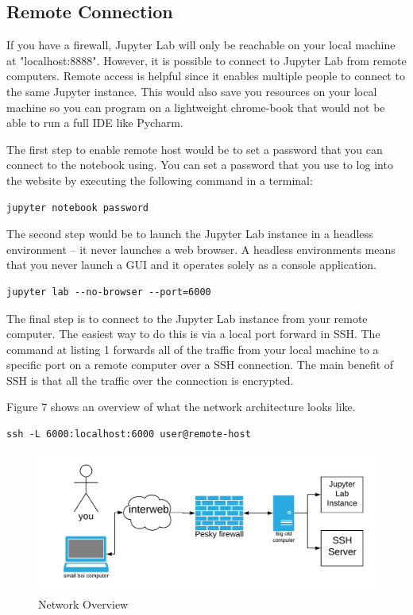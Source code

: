 \documentclass[pdftex,12pt]{artikel3}
\begin{document}
\subsection{Remote Connection}

If you have a firewall, Jupyter Lab will only be reachable on your
local machine at "localhost:8888". 
However, it is possible to connect to Jupyter Lab from remote computers. 
Remote access is helpful since it enables multiple people to connect to the same Jupyter instance. This would also save you resources on your local machine so you can program on a lightweight chrome-book that would not be able to run a full IDE like Pycharm.

The first step to enable remote host would be to set a password that you can connect to the notebook using. You can set a password that you use to log into the website by executing the following command in a terminal:

\begin{lstlisting}
jupyter notebook password
\end{lstlisting}

The second step would be to launch the Jupyter Lab instance in a headless environment -- it never launches a web browser. 
A headless environments means that you never launch a GUI and it operates solely as a console application. 

\begin{lstlisting}
jupyter lab --no-browser --port=6000
\end{lstlisting}

The final step is to connect to the Jupyter Lab instance from your
remote computer.
The easiest way to do this is via a local port forward in SSH. 
The command at listing 1 forwards all of the traffic from your local machine to a specific port on a remote computer over a SSH connection.
The main benefit of SSH is that all the traffic over the connection is encrypted.

Figure 7 shows an overview of what the network architecture looks like.

\newpage

\begin{lstlisting}[caption=SSH command for local port forwarding]
ssh -L 6000:localhost:6000 user@remote-host
\end{lstlisting}

\begin{figure}[h!]
    \centering
    \includegraphics[width=15cm]{remoteJupyter.png}
    \caption{Network Overview}
    \label{fig:jupyter_server}
\end{figure}
\end{document}
